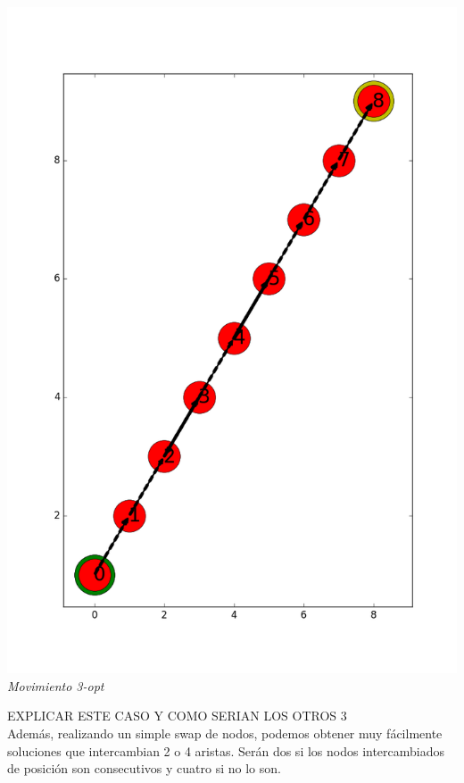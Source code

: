   \vspace*{0.3cm} \vspace*{0.3cm}
  \begin{center}
 \includegraphics[scale=0.3]{./EJ3/ejemplo3optCaso1.png}\\
 {            \textit{Movimiento 3-opt}}
  \end{center}
  \vspace*{0.3cm}
  
  EXPLICAR ESTE CASO Y COMO SERIAN LOS OTROS 3\\

Además, realizando un simple swap de nodos, podemos obtener muy fácilmente soluciones que intercambian 2 o 4 aristas. Serán dos si los nodos intercambiados de posición son consecutivos y cuatro si no lo son.

